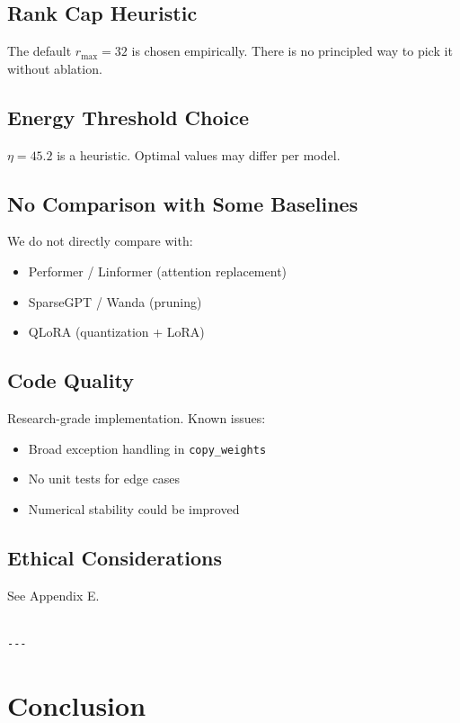 \subsection{Rank Cap Heuristic}

The default $r_\text{max} = 32$ is chosen empirically. There is no 
principled way to pick it without ablation.

\subsection{Energy Threshold Choice}

$\eta = 45.2$ is a heuristic. Optimal values may differ per model.

\subsection{No Comparison with Some Baselines}

We do not directly compare with:
\begin{itemize}
\item Performer / Linformer (attention replacement)
\item SparseGPT / Wanda (pruning)
\item QLoRA (quantization + LoRA)

\end{itemize}
\subsection{Code Quality}

Research-grade implementation. Known issues:
\begin{itemize}
\item Broad exception handling in \texttt{copy\_weights}
\item No unit tests for edge cases
\item Numerical stability could be improved

\end{itemize}
\subsection{Ethical Considerations}

See Appendix E.
\begin{lstlisting}

---
\end{lstlisting}


\section{Conclusion}

